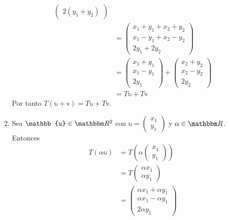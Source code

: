 \begin{example}
\begin{enumerate}[label=\roman*)]
\begin{align*}
\begin{pmatrix}
                2(y_1 + y_2)
            \end{pmatrix} \\
            & = \begin{pmatrix}
                x_1 + y_1 + x_2 + y_2 \\
                x_1 - y_1 + x_2 - y_2 \\
                2y_1 + 2y_2
            \end{pmatrix} \\
            & = \begin{pmatrix}
                x_1 + y_1 \\
                x_1 - y_1 \\
                2y_1
            \end{pmatrix} + \begin{pmatrix}
                x_2 + y_2 \\
                x_2 - y_2 \\
                2y_2
            \end{pmatrix} \\
            & = T\mathbb{u} + T\mathbb{v}
        \end{align*}
        Por tanto $T(\mathbb{u} + \mathbb{v}) = T\mathbb{u} + T\mathbb{v}$.
        \item Sea $\mathbb{u} \in \RR[2]$ con $\mathbb{u} = \begin{pmatrix}
            x_1 \\
            y_1
        \end{pmatrix}$ y $\alpha \in \RR$. Entonces
        \begin{align*}
            T(\alpha \mathbb{u}) & = T \left( \alpha \begin{pmatrix}
                x_1 \\
                y_1
            \end{pmatrix} \right) \\
            & = T \begin{pmatrix}
                \alpha x_1 \\
                \alpha y_1
            \end{pmatrix} \\
            & = \begin{pmatrix}
                \alpha x_1 + \alpha y_1 \\
                \alpha x_1 - \alpha y_1 \\
                2 \alpha y_1
            \end{pmatrix} \\

\end{align*}
\end{enumerate}
\end{example}
